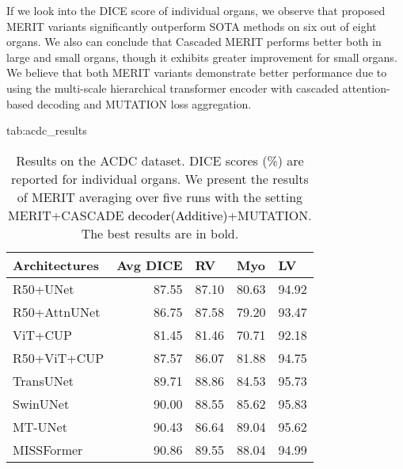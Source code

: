 \documentclass{midl}
\begin{document}
If we look into the DICE score of individual organs, we observe that proposed MERIT variants significantly outperform SOTA methods on six out of eight organs. We also can conclude that Cascaded MERIT performs better both in large and small organs, though it exhibits greater improvement for small organs. We believe that both MERIT variants demonstrate better performance due to using the multi-scale hierarchical transformer encoder with cascaded attention-based decoding and MUTATION loss aggregation. 


\begin{table*}[t]
\centering
\floatconts
{tab:acdc_results}
{\caption{Results on the ACDC dataset. DICE scores (\%) are reported for individual organs. We present the results of MERIT averaging over five runs with the setting MERIT+CASCADE \textcolor{black}{decoder(Additive)}+MUTATION. The best results are in bold.}
\vspace{-0.5cm}
} {\small{
{\begin{tabular}{lrrrr}
\toprule
Architectures     & \multicolumn{1}{l}{Avg DICE} & \multicolumn{1}{l}{RV} & \multicolumn{1}{l}{Myo} & \multicolumn{1}{l}{LV} \\
\midrule
R50+UNet   \cite{chen2021transunet}       & 87.55                        & 87.10                  & 80.63                   & 94.92                  \\
R50+AttnUNet  \cite{chen2021transunet}  & 86.75                        & 87.58                  & 79.20                   & 93.47                  \\
ViT+CUP \cite{chen2021transunet}   & 81.45                        & 81.46                  & 70.71                   & 92.18                 \\
R50+ViT+CUP \cite{chen2021transunet} & 87.57                        & 86.07                  & 81.88                   & 94.75                  \\
TransUNet  \cite{chen2021transunet}       & 89.71                        & 88.86                  &  84.53                   & 95.73                  \\   
SwinUNet \cite{cao2021swin}         & 90.00                        & 88.55                  & 85.62                   & 95.83                  \\
MT-UNet \cite{wang2022mixed}         & 90.43                        & 86.64                  & 89.04                   & 95.62                  \\
MISSFormer \cite{huang2021missformer}         & 90.86                        & 89.55                  & 88.04                   & 94.99                  \\

\end{tabular}}}}
\end{table*}
\end{document}
